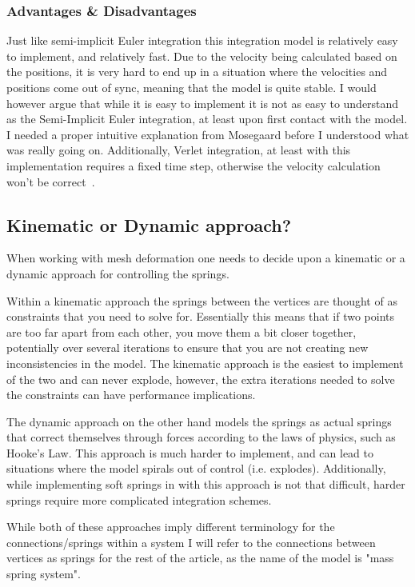 \subsubsection{Advantages \& Disadvantages}
Just like semi-implicit Euler integration this integration model is relatively easy to implement, and relatively fast.
Due to the velocity being calculated based on the positions, it is very hard to end up in a situation where the velocities and positions come out of sync,
meaning that the model is quite stable.
I would however argue that while it is easy to implement it is not as easy to understand as the Semi-Implicit Euler integration, at least upon first contact with the model.
I needed a proper intuitive explanation from Mosegaard\cite{mosegaards_clothing_simulation} before I understood what was really going on.
Additionally, Verlet integration, at least with this implementation requires a fixed time step, otherwise the velocity calculation won't be correct~\cite{alan_wake_mass_spring}.

\subsection{Kinematic or Dynamic approach?}
When working with mesh deformation one needs to decide upon a kinematic or a dynamic approach for controlling the springs.

Within a kinematic approach the springs between the vertices are thought of as constraints that you need to solve for.
Essentially this means that if two points are too far apart from each other, you move them a bit closer together, potentially over several iterations to ensure that you are not creating
new inconsistencies in the model.
The kinematic approach is the easiest to implement of the two and can never explode, however, the extra iterations needed to solve the constraints can have performance implications.

The dynamic approach on the other hand models the springs as actual springs that correct themselves through forces according to the laws of physics, such as Hooke's Law.
This approach is much harder to implement, and can lead to situations where the model spirals out of control (i.e. explodes).
Additionally, while implementing soft springs in with this approach is not that difficult, harder springs require more complicated integration schemes\cite{math_for_games}.

While both of these approaches imply different terminology for the connections/springs within a system I will refer to the connections between vertices as springs for the rest of the article, as the name of the model is "mass spring system".

